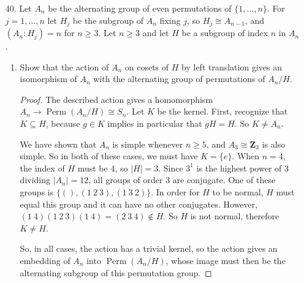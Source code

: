 \documentclass[10pt]{article}
\newcommand{\Z}{\mathbf{Z}}
\DeclareMathOperator*{\Perm}{Perm}
\begin{document}
\begin{enumerate}
\begin{proof}
Suppose we are given two tuples $(s_1, \dots , s_{n-2})$ and $(t_1, \dots , t_{n-2})$ of $n-2$ distinct elements from $\{1,\dots,n\}$.  Then $\{1,\dots,n\} \setminus \{s_1, \dots , s_{n-2}\}$ is some set of two elements $s_{n-1}, s_n$, and $\{1,\dots,n\} \setminus \{t_1, \dots , t_{n-2}\}$ is some set of two elements $t_{n-1}, t_n$.  We can form the permutation
$ \sigma = 
\begin{pmatrix}
s_1 & \cdots & s_{n} \\
t_1 & \cdots & t_{n}
\end{pmatrix}.
$
If $\sigma$ is an even permutation, then we are done.  Otherwise, $\sigma \circ (s_{n-1} \ s_n)$ is an even permutation which has the same effect on the elements we are interested in.
\end{proof}

\item[40.] Let $A_n$ be the alternating group of even permutations of $\{1,\dots , n\}$.  For $j = 1, \dots , n$ let $H_j$ be the subgroup of $A_n$ fixing $j$, so $H_j \cong A_{n-1}$, and $(A_n : H_j) = n$ for $n \geq 3$.  Let $n \geq 3$ and let $H$ be a subgroup of index $n$ in $A_n$.
\begin{enumerate}
\item Show that the action of $A_n$ on cosets of $H$ by left translation gives an isomorphism of $A_n$ with the alternating group of permutations of $A_n / H$.

\begin{proof}
The described action gives a homomorphism $A_n \rightarrow \Perm (A_n / H) \cong S_n$.  Let $K$ be the kernel.  First, recognize that $K \subseteq H$, because $g \in K$ implies in particular that $gH = H$.  So $K \neq A_n$.

We have shown that $A_n$ is simple whenever $n \geq 5$, and $A_3 \cong \Z_3$ is also simple.  So in both of these cases, we must have $K = \{e\}$.  When $n = 4$, the index of $H$ must be 4, so $|H| = 3$.  Since $3^1$ is the highest power of $3$ dividing $|A_n| = 12$, all groups of order $3$ are conjugate.  One of these groups is $\{(), (1 \ 2 \ 3), (1 \ 3 \ 2)\}$.  In order for $H$ to be normal, $H$ must equal this group and it can have no other conjugates.  However, $(1 \ 4) (1 \ 2 \ 3)(1 \ 4) = (2 \ 3 \ 4) \not \in H$.  So $H$ is not normal, therefore $K \neq H$.

So, in all cases, the action has a trivial kernel, so the action gives an embedding of $A_n$ into $\Perm(A_n / H)$, whose image must then be the alternating subgroup of this permutation group.
\end{proof}


\end{enumerate}
\end{enumerate}
\end{document}
